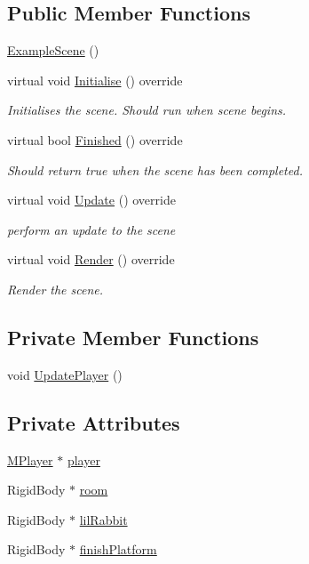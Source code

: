 \subsection*{Public Member Functions}
\begin{DoxyCompactItemize}
\item 
\hyperlink{class_example_scene_a3ac02eb25a50fda48a5c1938efd2a864}{Example\+Scene} ()
\item 
virtual void \hyperlink{class_example_scene_abefdca9d2fe1edadce53c70c5ed0e493}{Initialise} () override
\begin{DoxyCompactList}\small\item\em Initialises the scene. Should run when scene begins. \end{DoxyCompactList}\item 
virtual bool \hyperlink{class_example_scene_a598387949635fbd8746c842261a30d6c}{Finished} () override
\begin{DoxyCompactList}\small\item\em Should return true when the scene has been completed. \end{DoxyCompactList}\item 
virtual void \hyperlink{class_example_scene_a92b6c6c89e8e565b48d3013aeb210ac6}{Update} () override
\begin{DoxyCompactList}\small\item\em perform an update to the scene \end{DoxyCompactList}\item 
virtual void \hyperlink{class_example_scene_af1155580e35b287eb88d1bc81bba0376}{Render} () override
\begin{DoxyCompactList}\small\item\em Render the scene. \end{DoxyCompactList}\end{DoxyCompactItemize}
\subsection*{Private Member Functions}
\begin{DoxyCompactItemize}
\item 
void \hyperlink{class_example_scene_a8bdc4c3e8e005ac5e972e052d5413645}{Update\+Player} ()
\end{DoxyCompactItemize}
\subsection*{Private Attributes}
\begin{DoxyCompactItemize}
\item 
\hyperlink{class_m_player}{M\+Player} $\ast$ \hyperlink{class_example_scene_ae2bcd80d4ffd43714565e42129dc624b}{player}
\item 
Rigid\+Body $\ast$ \hyperlink{class_example_scene_ae6292ce4efb3919a610deffea4c0c4f1}{room}
\item 
Rigid\+Body $\ast$ \hyperlink{class_example_scene_a5c3d5896fb864c2005e71dde8e5b2591}{lil\+Rabbit}
\item 
Rigid\+Body $\ast$ \hyperlink{class_example_scene_afbff0ff25c73017d1900527e7c8b3588}{finish\+Platform}
\end{DoxyCompactItemize}


